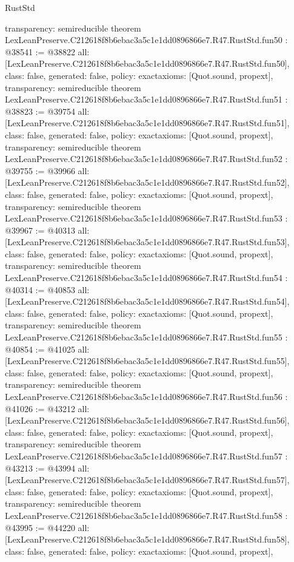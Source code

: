 \begin{lexlean}{RustStd}
\begin{coremodule}
{  transparency: semireducible
}
theorem LexLeanPreserve.C212618f8b6ebac3a5c1e1dd0896866e7.R47.RustStd.fun50 : @38541 := @38822 {
  all: [LexLeanPreserve.C212618f8b6ebac3a5c1e1dd0896866e7.R47.RustStd.fun50],
  class: false,
  generated: false,
  policy: exact{axioms: [Quot.sound, propext]},
  transparency: semireducible
}
theorem LexLeanPreserve.C212618f8b6ebac3a5c1e1dd0896866e7.R47.RustStd.fun51 : @38823 := @39754 {
  all: [LexLeanPreserve.C212618f8b6ebac3a5c1e1dd0896866e7.R47.RustStd.fun51],
  class: false,
  generated: false,
  policy: exact{axioms: [Quot.sound, propext]},
  transparency: semireducible
}
theorem LexLeanPreserve.C212618f8b6ebac3a5c1e1dd0896866e7.R47.RustStd.fun52 : @39755 := @39966 {
  all: [LexLeanPreserve.C212618f8b6ebac3a5c1e1dd0896866e7.R47.RustStd.fun52],
  class: false,
  generated: false,
  policy: exact{axioms: [Quot.sound, propext]},
  transparency: semireducible
}
theorem LexLeanPreserve.C212618f8b6ebac3a5c1e1dd0896866e7.R47.RustStd.fun53 : @39967 := @40313 {
  all: [LexLeanPreserve.C212618f8b6ebac3a5c1e1dd0896866e7.R47.RustStd.fun53],
  class: false,
  generated: false,
  policy: exact{axioms: [Quot.sound, propext]},
  transparency: semireducible
}
theorem LexLeanPreserve.C212618f8b6ebac3a5c1e1dd0896866e7.R47.RustStd.fun54 : @40314 := @40853 {
  all: [LexLeanPreserve.C212618f8b6ebac3a5c1e1dd0896866e7.R47.RustStd.fun54],
  class: false,
  generated: false,
  policy: exact{axioms: [Quot.sound, propext]},
  transparency: semireducible
}
theorem LexLeanPreserve.C212618f8b6ebac3a5c1e1dd0896866e7.R47.RustStd.fun55 : @40854 := @41025 {
  all: [LexLeanPreserve.C212618f8b6ebac3a5c1e1dd0896866e7.R47.RustStd.fun55],
  class: false,
  generated: false,
  policy: exact{axioms: [Quot.sound, propext]},
  transparency: semireducible
}
theorem LexLeanPreserve.C212618f8b6ebac3a5c1e1dd0896866e7.R47.RustStd.fun56 : @41026 := @43212 {
  all: [LexLeanPreserve.C212618f8b6ebac3a5c1e1dd0896866e7.R47.RustStd.fun56],
  class: false,
  generated: false,
  policy: exact{axioms: [Quot.sound, propext]},
  transparency: semireducible
}
theorem LexLeanPreserve.C212618f8b6ebac3a5c1e1dd0896866e7.R47.RustStd.fun57 : @43213 := @43994 {
  all: [LexLeanPreserve.C212618f8b6ebac3a5c1e1dd0896866e7.R47.RustStd.fun57],
  class: false,
  generated: false,
  policy: exact{axioms: [Quot.sound, propext]},
  transparency: semireducible
}
theorem LexLeanPreserve.C212618f8b6ebac3a5c1e1dd0896866e7.R47.RustStd.fun58 : @43995 := @44220 {
  all: [LexLeanPreserve.C212618f8b6ebac3a5c1e1dd0896866e7.R47.RustStd.fun58],
  class: false,
  generated: false,
  policy: exact{axioms: [Quot.sound, propext]},
}
\end{coremodule}
\end{lexlean}
